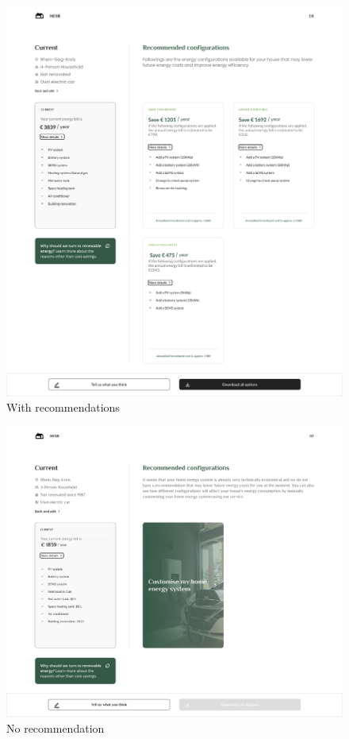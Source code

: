 \begin{figure}[h!]
  \centering
  \includegraphics[width=\textwidth]{Images/recommendation.png}
  \caption{With recommendations}
  \label{fig:recommendation}
\end{figure}
\begin{figure}[h!]
  \centering
  \includegraphics[width=\textwidth]{Images/recommendation_null.png}
  \caption{No recommendation}
  \label{fig:recommendation_null}
\end{figure}



